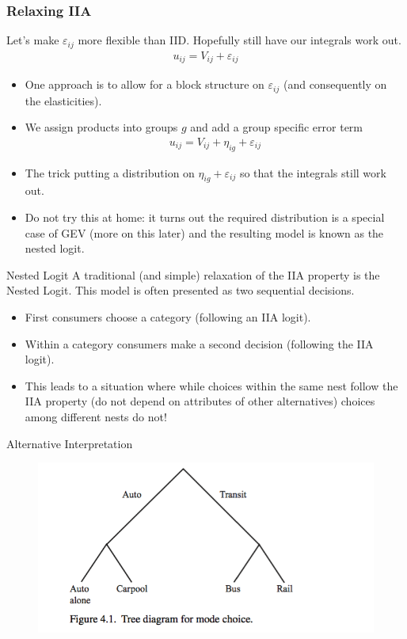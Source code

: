 \documentclass[xcolor=pdftex,dvipsnames,table,mathserif,aspectratio=169]{beamer}
\begin{document}
\begin{frame}
\frametitle{Relaxing IIA}
Let's make $\varepsilon_{ij}$ more flexible than IID. Hopefully still have our integrals work out.
\begin{eqnarray*}
u_{ij} =   V_{ij}  + \varepsilon_{ij}
\end{eqnarray*}
\begin{itemize}
\item One approach is to allow for a block structure on $\varepsilon_{ij}$ (and consequently on the elasticities).
\item We assign products into groups $g$ and add a group specific error term
\begin{eqnarray*}
u_{ij} =V_{ij}  + \eta_{ig} + \varepsilon_{ij}
\end{eqnarray*}
\item The trick putting a distribution on $\eta_{ig} + \varepsilon_{ij}$ so that the integrals still work out.
\item Do not try this at home: it turns out the required distribution is a special case of \alert{GEV} (more on this later) and the resulting model is known as the \alert{nested logit}.
\end{itemize}
\end{frame}

\begin{frame}{Nested Logit}
A traditional (and simple) relaxation of the IIA property is the Nested Logit. This model is often presented as two sequential decisions.
\begin{itemize}
\item First consumers choose a category (following an IIA logit).
\item Within a category consumers make a second decision (following the IIA logit).
\item This leads to a situation where while choices within the same nest follow the IIA property (do not depend on attributes of other alternatives) choices among different nests do not!
\end{itemize}
\end{frame}

\begin{frame}{Alternative Interpretation}
\begin{figure}[htbp]
\begin{center}
\includegraphics[width=5in]{resources/nesting.png}
\end{center}
\end{figure}
\end{frame}
\end{document}

